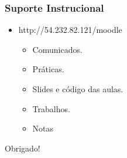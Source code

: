 \documentclass{beamer}
\begin{document}
\begin{frame}
		\frametitle{Suporte Instrucional}
		\begin{itemize}
			\item http://54.232.82.121/moodle
					\begin{itemize}
						\item Comunicados.
						\item Práticas.
						\item Slides e código das aulas.
						\item Trabalhos.
			
						\item Notas
						\end{itemize}		
		\end{itemize}
	\end{frame}
	
	
	\begin{frame}				
		\begin{center}
			\vspace{1cm}
			{ \Huge Obrigado!\\}
			\vspace{0.5cm}
		\end{center}
	\end{frame}	 
\end{document}
